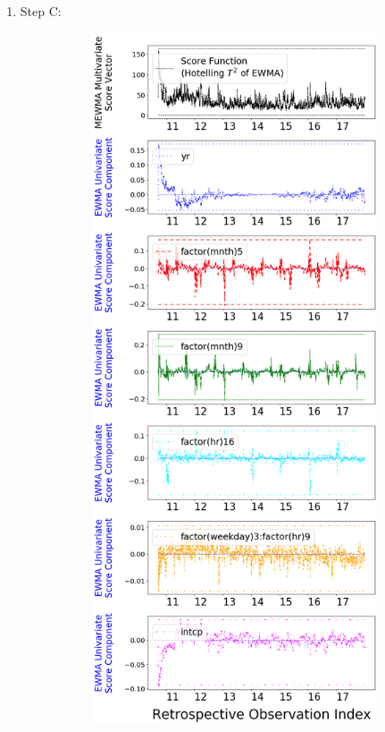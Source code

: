 \documentclass[twoside,11pt]{article}
\begin{document}
\begin{enumerate}
\item Step C:

\begin{figure}[H]
\centering
    \begin{subfigure}[t]{0.32\linewidth}
     \centering
         \includegraphics[width=1.0\textwidth, trim=.0in .0in .0in .0in, clip]{../figures/v14/bike_sharing/reg_lin_C/PII_pos_single_retro_bike_fisher_mlines_with_regu_1e-08_0_0001_0_01_99_99.png}

\end{subfigure}
\end{figure}
\end{enumerate}
\end{document}
